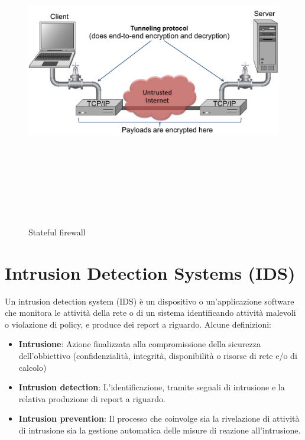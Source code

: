 \begin{figure}[htbp]
	\centering%
	\subfigure%
	{\includegraphics[height=13cm, width=13cm, keepaspectratio]{Immagini/firewalls/tunnel.png}}
	\caption{Stateful firewall \label{fig:tunnel}} 	
\end{figure}

\section{Intrusion Detection Systems (IDS)}
Un intrusion detection system (IDS) è un dispositivo o un'applicazione software che monitora le attività della rete o di un sistema identificando attività malevoli o violazione di policy, e produce dei report a riguardo.
Alcune definizioni:
\begin{itemize}
\item \textbf{Intrusione}: Azione finalizzata alla compromissione della sicurezza dell'obbiettivo (confidenzialità, integrità, disponibilità o risorse di rete e/o di calcolo)
\item \textbf{Intrusion detection}: L'identificazione, tramite segnali di intrusione e la relativa produzione di report a riguardo.
\item \textbf{Intrusion prevention}: Il processo che coinvolge sia la rivelazione di attività di intrusione sia la gestione automatica delle misure di reazione all'intrusione.
\end{itemize}

